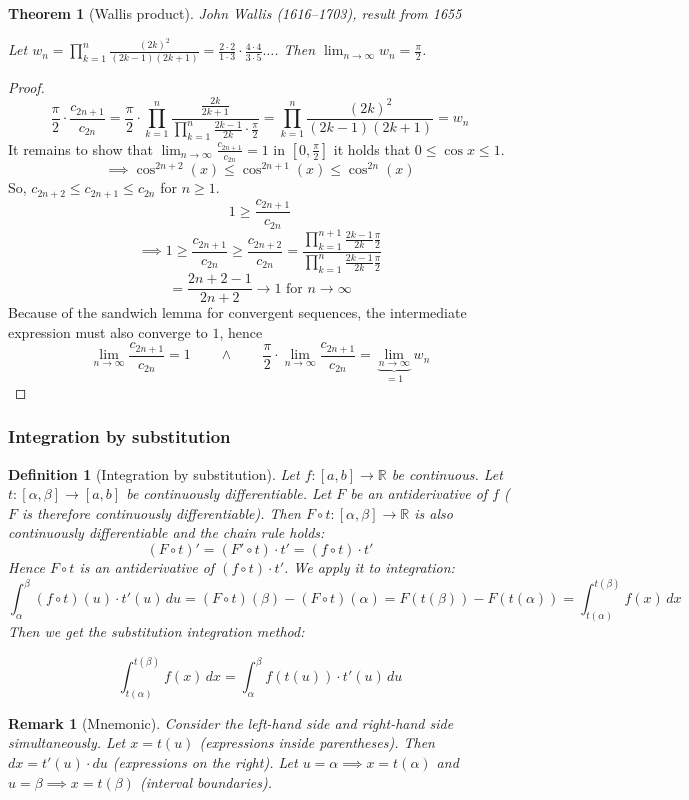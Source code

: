 \documentclass{article}
\newtheorem{theorem}{Theorem}  \numberwithin{theorem}{section}
\newtheorem{definition}{Definition}  \numberwithin{definition}{section}
\newtheorem{remark}{Remark}  \numberwithin{remark}{section}
\begin{document}
\begin{theorem}[Wallis product]
  John Wallis (1616--1703), result from 1655

  Let $w_n = \prod_{k=1}^n \frac{(2k)^2}{(2k - 1)(2k + 1)} = \frac{2\cdot 2}{1 \cdot 3} \cdot \frac{4 \cdot 4}{3 \cdot 5} \ldots$.
  Then $\lim_{n\to\infty} w_n = \frac\pi2$.
\end{theorem}
\begin{proof}
  \[
    \frac\pi2 \cdot \frac{c_{2n+1}}{c_{2n}}
    = \frac\pi2 \cdot \prod_{k=1}^n \frac{\frac{2k}{2k+1}}{\prod_{k=1}^n \frac{2k-1}{2k} \cdot \frac\pi2}
    = \prod_{k=1}^n \frac{(2k)^2}{(2k-1)(2k+1)} = w_n
  \]
  It remains to show that $\lim_{n\to\infty} \frac{c_{2n+1}}{c_{2n}} = 1$ in $[0, \frac\pi2]$ it holds that $0 \leq \cos{x} \leq 1$.
  \[ \implies \cos^{2n+2}(x) \leq \cos^{2n+1}(x) \leq \cos^{2n}(x) \]
  So, $c_{2n+2} \leq c_{2n+1} \leq c_{2n}$ for $n \geq 1$.
  \[ 1 \geq \frac{c_{2n+1}}{c_{2n}} \]
  \[ \implies 1 \geq \frac{c_{2n+1}}{c_{2n}} \geq \frac{c_{2n+2}}{c_{2n}} = \frac{\prod_{k=1}^{n+1} \frac{2k-1}{2k} \frac\pi2}{\prod_{k=1}^n \frac{2k-1}{2k} \frac\pi2} \]
  \[ = \frac{2n + 2 - 1}{2n + 2} \to 1  \text{ for } n \to \infty \]
  Because of the sandwich lemma for convergent sequences, the intermediate expression must also converge to $1$, hence
  \[ \lim_{n\to\infty} \frac{c_{2n+1}}{c_{2n}} = 1 \qquad \land \qquad \frac\pi2 \cdot \lim_{n\to\infty} \frac{c_{2n+1}}{c_{2n}} = \underbrace{\lim_{n\to\infty}}_{=1} w_n \]
\end{proof}

\subsubsection{Integration by substitution}
\begin{definition}[Integration by substitution]
  Let $f: [a,b] \to \mathbb R$ be continuous.
  Let $t: [\alpha,\beta] \to [a,b]$ be continuously differentiable.
  Let $F$ be an antiderivative of $f$ ($F$ is therefore continuously differentiable).
  Then $F \circ t: [\alpha, \beta] \to \mathbb R$ is also continuously differentiable and the chain rule holds:
  \[ (F \circ t)' = (F' \circ t) \cdot t' = (f \circ t) \cdot t' \]
  Hence $F \circ t$ is an antiderivative of $(f \circ t) \cdot t'$. We apply it to integration:
  \[
    \int_{\alpha}^\beta (f \circ t)(u) \cdot t'(u) \, du
    = (F \circ t)(\beta) - (F \circ t)(\alpha)
    = F(t(\beta)) - F(t(\alpha)) = \int_{t(\alpha)}^{t(\beta)} f(x) \, dx
  \]
  Then we get the substitution integration method:
  \begin{framed}
  \[
    \int_{t(\alpha)}^{t(\beta)} f(x) \, dx = \int_{\alpha}^\beta f(t(u)) \cdot t'(u) \, du
  \]
  \end{framed}
\end{definition}
\begin{remark}[Mnemonic]
  Consider the left-hand side and right-hand side simultaneously.
  Let $x = t(u)$ (expressions inside parentheses). Then $dx = t'(u) \cdot du$ (expressions on the right).
  Let $u = \alpha \implies x = t(\alpha)$ and $u = \beta \implies x = t(\beta)$ (interval boundaries).
\end{remark}
\end{document}
